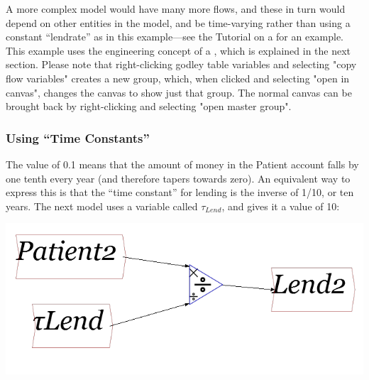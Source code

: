 A more complex model would have many more flows, and these in turn
would depend on other entities in the model, and be time-varying rather
than using a constant ``lendrate'' as in this example---see the
Tutorial on a 
for an example. This example uses the engineering concept of a , which is explained in the next section.
Please note that right-clicking godley table variables and selecting
"copy flow variables" creates a new group, which, when clicked and
selecting "open in canvas", changes the canvas to show just that
group. The normal canvas can be brought back by right-clicking and
selecting "open master group".

\subsubsection{Using \textquotedblleft Time Constants\textquotedblright}

\label{time-constants}

The value of 0.1 means that the amount of money in the Patient account
falls by one tenth every year (and therefore tapers towards zero).
An equivalent way to express this is that the ``time constant''
for lending is the inverse of 1/10, or ten years. The next model uses
a variable called $\tau_{Lend}$, and gives it a value of 10:
\begin{center}
\includegraphics{images/NewItem158} 
\par\end{center}

